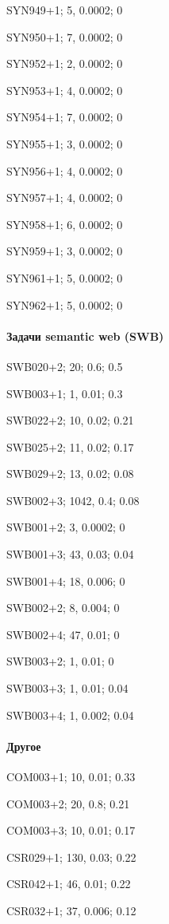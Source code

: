 SYN949+1; 5, 0.0002; 0

SYN950+1; 7, 0.0002; 0

SYN952+1; 2, 0.0002; 0

SYN953+1; 4, 0.0002; 0

SYN954+1; 7, 0.0002; 0

SYN955+1; 3, 0.0002; 0

SYN956+1; 4, 0.0002; 0

SYN957+1; 4, 0.0002; 0

SYN958+1; 6, 0.0002; 0

SYN959+1; 3, 0.0002; 0

SYN961+1; 5, 0.0002; 0

SYN962+1; 5, 0.0002; 0

\paragraph{Задачи semantic web (SWB)}

SWB020+2; 20; 0.6; 0.5

SWB003+1; 1, 0.01; 0.3

SWB022+2; 10, 0.02; 0.21

SWB025+2; 11, 0.02; 0.17

SWB029+2; 13, 0.02; 0.08

SWB002+3; 1042, 0.4; 0.08

SWB001+2; 3, 0.0002; 0

SWB001+3; 43, 0.03; 0.04

SWB001+4; 18, 0.006; 0

SWB002+2; 8, 0.004; 0

SWB002+4; 47, 0.01; 0

SWB003+2; 1, 0.01; 0

SWB003+3; 1, 0.01; 0.04

SWB003+4; 1, 0.002; 0.04


\paragraph{Другое}

COM003+1; 10, 0.01; 0.33

COM003+2; 20, 0.8; 0.21

COM003+3; 10, 0.01; 0.17

CSR029+1; 130, 0.03; 0.22

CSR042+1; 46, 0.01; 0.22

CSR032+1; 37, 0.006; 0.12

